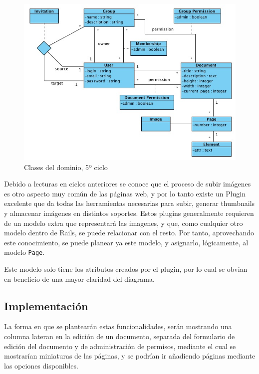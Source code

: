 \begin{figure}[h!]
\centering
\includegraphics[width=14cm]{uml5.png}
\caption{Clases del dominio, 5º ciclo}\label{fig:uml5}
\end{figure}

Debido a lecturas en ciclos anteriores se conoce que el proceso de subir imágenes es otro aspecto muy común de las páginas web, y por lo tanto existe un Plugin excelente que da todas las herramientas necesarias para subir, generar thumbnails y almacenar imágenes en distintos soportes. Estos plugins generalmente requieren de un modelo extra que representará las imagenes, y que, como cualquier otro modelo dentro de Rails, se puede relacionar con el resto. Por tanto, aprovechando este conocimiento, se puede planear ya este modelo, y asignarlo, lógicamente, al modelo \texttt{Page}.

Este modelo solo tiene los atributos creados por el plugin, por lo cual se obvian en beneficio de una mayor claridad del diagrama.


\subsection{Implementación} %
\label{sub:implementación}

La forma en que se plantearán estas funcionalidades, serán mostrando una columna lateran en la edición de un documento, separada del formulario de edición del documento y de administración de permisos, mediante el cual se mostrarían miniaturas de las páginas, y se podrían ir añadiendo páginas mediante las opciones disponibles. 

